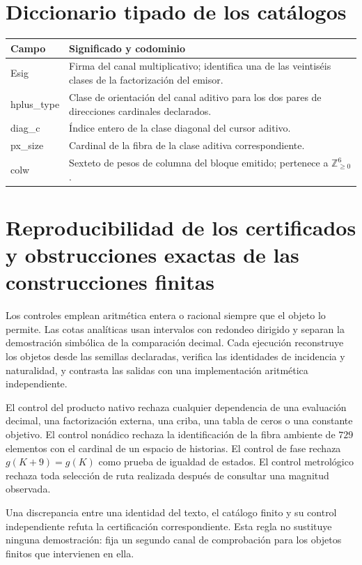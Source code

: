 \section{Diccionario tipado de los catálogos}

\begin{longtable}{>{\ttfamily}p{}>{\raggedright\arraybackslash}p{}}
\toprule
Campo & Significado y codominio\\
\midrule
\endhead
Esig & Firma del canal multiplicativo; identifica una de las veintiséis
clases de la factorización del emisor.\\
hplus\_type & Clase de orientación del canal aditivo para los dos pares de
direcciones cardinales declarados.\\
diag\_c & Índice entero de la clase diagonal del cursor aditivo.\\
px\_size & Cardinal de la fibra de la clase aditiva correspondiente.\\
colw & Sexteto de pesos de columna del bloque emitido; pertenece a
\(\mathbb Z_{\geq0}^{6}\).\\
\bottomrule
\end{longtable}

\section{Reproducibilidad de los certificados y obstrucciones exactas de las construcciones finitas}

Los controles emplean aritmética entera o racional siempre que el objeto lo
permite. Las cotas analíticas usan intervalos con redondeo dirigido y separan
la demostración simbólica de la comparación decimal. Cada ejecución
reconstruye los objetos desde las semillas declaradas, verifica las identidades
de incidencia y naturalidad, y contrasta las salidas con una implementación
aritmética independiente.

El control del producto nativo rechaza cualquier dependencia de una evaluación
decimal, una factorización externa, una criba, una tabla de ceros o una
constante objetivo. El control nonádico rechaza la identificación de la fibra
ambiente de \(729\) elementos con el cardinal de un espacio de historias. El
control de fase rechaza \(g(K+9)=g(K)\) como prueba de igualdad de estados. El
control metrológico rechaza toda selección de ruta realizada después de
consultar una magnitud observada.

Una discrepancia entre una identidad del texto, el catálogo finito y su control
independiente refuta la certificación correspondiente. Esta regla no sustituye
ninguna demostración: fija un segundo canal de comprobación para los objetos
finitos que intervienen en ella.
